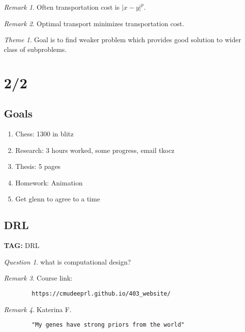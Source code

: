 \documentclass[11pt]{article}
\theoremstyle{remark}
\newtheorem{remark}{Remark}
\newtheorem{quest}{Question}
\newtheorem{theme}{Theme}
\begin{document}
\begin{remark}
	Often transportation cost is $|x-y|^p$. 
\end{remark}

\begin{remark}
	Optimal transport minimizes transportation cost.
\end{remark}

\begin{theme}
	Goal is to find weaker problem which provides good solution to wider class of subproblems.
\end{theme}


\section{2/2}

\subsection{Goals}

\begin{enumerate}
	\item Chess: 1300 in blitz
	\item Research: 3 hours worked, some progress, email tkocz
	\item Thesis: 5 pages
	\item Homework: Animation
	\item Get glenn to agree to a time
\end{enumerate}

\subsection{DRL}

\textbf{TAG:} DRL

\begin{quest}
	what is computational design?
\end{quest}

\begin{remark}
	Course link: 
	\begin{verbatim}
		https://cmudeeprl.github.io/403_website/
	\end{verbatim}
\end{remark}

\begin{remark}
	Katerina F.
	\begin{verbatim}
		"My genes have strong priors from the world"
	\end{verbatim}
\end{remark}
\end{document}
